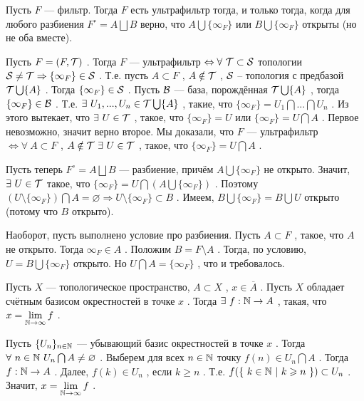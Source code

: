\SSsect Пусть \( F \) --- фильтр. Тогда \( F \) есть ультрафильтр тогда, и только тогда, когда для любого разбиения \( F^{\circ} = A \bigsqcup B \) верно, что \( A \bigcup \{\infty_F\} \) или \( B \bigcup \{\infty_F\} \) открыты (но не оба вместе).

\SSproof

Пусть \( F = (F,\mathcal{T}) \) . Тогда \( F \) --- ультрафильтр \( \Leftrightarrow \forall~ \mathcal{T} \subset \mathcal{S} \) топологии \( \mathcal{S} \neq \mathcal{T} \Rightarrow \{\infty_F\} \in \mathcal{S} \) . Т.е. пусть \( A \subset F \) , \( A \notin \mathcal{T} \) , \( \mathcal{S} \) -- топология с предбазой \( \mathcal{T} \bigcup \{A\} \) . Тогда \( \{\infty_F\} \in \mathcal{S} \) . Пусть \( \mathcal{B} \) --- база, порождённая \( \mathcal{T} \bigcup \{A\} \) , тогда \( \{\infty_F\} \in \mathcal{B} \) . Т.е. \( \exists~U_1,...,U_n \in \mathcal{T} \bigcup \{A\} \) , такие, что \( \{\infty_F\} = U_1\bigcap ... \bigcap U_n \) . Из этого вытекает, что \( \exists~U \in \mathcal{T} \) , такое, что \( \{\infty_F\} = U \) или \( \{\infty_F\} = U \bigcap A \) . Первое невозможно, значит верно второе. Мы доказали, что \( F \) --- ультрафильтр \( \Leftrightarrow \forall~ A \subset F \) , \( A \notin \mathcal{T} ~\exists~ U \in \mathcal{T} \) , такое, что \( \{\infty_F\} = U \bigcap A \) .

Пусть теперь \( F^{\circ} = A \bigsqcup B \) --- разбиение, причём \( A \bigcup \{\infty_F\} \) не открыто. Значит, \( \exists~ U \in \mathcal{T} \) такое, что \( \{\infty_F\} = U \bigcap (A \bigcup \{\infty_F\}) \) . Поэтому \( (U \setminus \{\infty_F\}) \bigcap A = \varnothing \Rightarrow U \setminus \{\infty_F\} \subset B \) . Имеем, \( B \bigcup \{\infty_F\} = B \bigcup U \) открыто (потому что \( B \) открыто).

Наоборот, пусть выполнено условие про разбиения. Пусть \( A \subset F \) , такое, что \( A \) не открыто. Тогда \( \infty_F \in A \) . Положим \( B = F \setminus A \) . Тогда, по условию, \( U = B \bigcup \{\infty_F\} \) открыто. Но \( U \bigcap A = \{\infty_F\} \) , что и требовалось.

\SSendp

\SSsect Пусть \( X \) --- топологическое пространство, \( A \subset X \) , \( x \in \overline{A} \) . Пусть \( X \) обладает счётным базисом окрестностей в точке \( x \) . Тогда \( \exists~f:\mathbb{N} \rightarrow A \) , такая, что \( x = \lim\limits_{\mathbb{N} \rightarrow \infty} f \) .

\SSproof

Пусть \( \{U_n\}_{n \in \mathbb{N}} \) --- убывающий базис окрестностей в точке \( x \) . Тогда \( \forall~n \in \mathbb{N}~U_n\bigcap A \neq \varnothing \) . Выберем для всех \( n \in \mathbb{N} \) точку \( f(n) \in U_n\bigcap A \) . Тогда \( f:\mathbb{N} \rightarrow A \) . Далее, \( f(k) \in U_n \) , если \( k \geqslant n \) . Т.е. \( f(\{~k \in \mathbb{N}~|~k \geqslant n~\}) \subset U_n \) . Значит, \( x = \lim\limits_{\mathbb{N} \rightarrow \infty} f \) .

